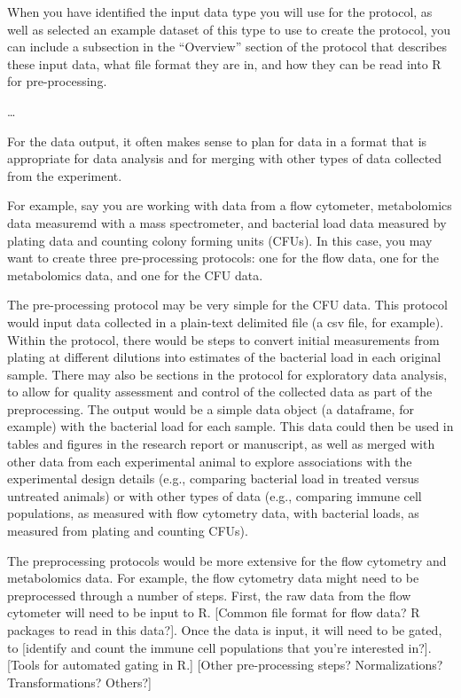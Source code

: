 \documentclass[]{tufte-book}
\begin{document}
When you have identified the input data type you will use for the protocol,
as well as selected an example dataset of this type to use to create the
protocol, you can include a subsection in the ``Overview'' section of the protocol
that describes these input data, what file format they are in, and how they
can be read into R for pre-processing.

\ldots{}

For the data output, it often makes sense to plan for data in a
format that is appropriate for data analysis and for merging with other types of
data collected from the experiment.

For example, say you are working with data from a flow cytometer, metabolomics
data measuremd with a mass spectrometer, and bacterial load data measured by
plating data and counting colony forming units (CFUs). In this case, you may
want to create three pre-processing protocols: one for the flow data, one for
the metabolomics data, and one for the CFU data.

The pre-processing protocol may be very simple for the CFU data. This protocol
would input data collected in a plain-text delimited file (a csv file, for
example). Within the protocol, there would be steps to convert initial
measurements from plating at different dilutions into estimates of the bacterial
load in each original sample. There may also be sections in the protocol for
exploratory data analysis, to allow for quality assessment and control of the
collected data as part of the preprocessing. The output would be a simple data
object (a dataframe, for example) with the bacterial load for each sample. This
data could then be used in tables and figures in the research report or
manuscript, as well as merged with other data from each experimental animal to
explore associations with the experimental design details (e.g., comparing
bacterial load in treated versus untreated animals) or with other types of data
(e.g., comparing immune cell populations, as measured with flow cytometry data,
with bacterial loads, as measured from plating and counting CFUs).

The preprocessing protocols would be more extensive for the flow cytometry and
metabolomics data. For example, the flow cytometry data might need to be
preprocessed through a number of steps. First, the raw data from the flow
cytometer will need to be input to R. {[}Common file format for flow data? R
packages to read in this data?{]}. Once the data is input, it will need to be
gated, to {[}identify and count the immune cell populations that you're interested
in?{]}. {[}Tools for automated gating in R.{]} {[}Other pre-processing steps?
Normalizations? Transformations? Others?{]}
\end{document}
